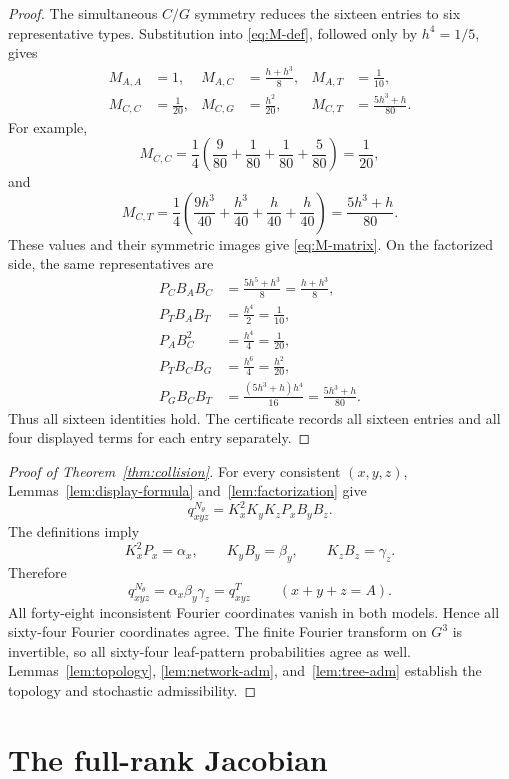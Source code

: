 \documentclass[11pt]{article}
\theoremstyle{remark}
\begin{document}
\begin{proof}
The simultaneous $C/G$ symmetry reduces the sixteen entries to six representative types.  Substitution into \eqref{eq:M-def}, followed only by $h^4=1/5$, gives
\begin{align*}
 M_{A,A}&=1,&
 M_{A,C}&=\frac{h+h^3}{8},&
 M_{A,T}&=\frac1{10},\\
 M_{C,C}&=\frac1{20},&
 M_{C,G}&=\frac{h^2}{20},&
 M_{C,T}&=\frac{5h^3+h}{80}.
\end{align*}
For example,
\[
 M_{C,C}=\frac14\left(\frac9{80}+\frac1{80}+\frac1{80}+\frac5{80}\right)=\frac1{20},
\]
and
\[
 M_{C,T}=\frac14\left(\frac{9h^3}{40}+\frac{h^3}{40}
 +\frac{h}{40}+\frac{h}{40}\right)=\frac{5h^3+h}{80}.
\]
These values and their symmetric images give \eqref{eq:M-matrix}.  On the factorized side, the same representatives are
\begin{align*}
 P_C B_A B_C&=\frac{5h^5+h^3}{8}=\frac{h+h^3}{8},\\
 P_T B_A B_T&=\frac{h^4}{2}=\frac1{10},\\
 P_A B_C^2&=\frac{h^4}{4}=\frac1{20},\\
 P_T B_C B_G&=\frac{h^6}{4}=\frac{h^2}{20},\\
 P_G B_C B_T&=\frac{(5h^3+h)h^4}{16}=\frac{5h^3+h}{80}.
\end{align*}
Thus all sixteen identities hold.  The certificate records all sixteen entries and all four displayed terms for each entry separately.
\end{proof}

\begin{proof}[Proof of Theorem~\ref{thm:collision}]
For every consistent $(x,y,z)$, Lemmas~\ref{lem:display-formula} and~\ref{lem:factorization} give
\[
 q^{N_\theta}_{xyz}
 =K_x^2K_yK_zP_xB_yB_z.
\]
The definitions imply
\[
 K_x^2P_x=\alpha_x,
 \qquad
 K_yB_y=\beta_y,
 \qquad
 K_zB_z=\gamma_z.
\]
Therefore
\begin{equation}\label{eq:full-equality}
 q^{N_\theta}_{xyz}=\alpha_x\beta_y\gamma_z=q^T_{xyz}
 \qquad(x+y+z=A).
\end{equation}
All forty-eight inconsistent Fourier coordinates vanish in both models.  Hence all sixty-four Fourier coordinates agree.  The finite Fourier transform on $G^3$ is invertible, so all sixty-four leaf-pattern probabilities agree as well.  Lemmas~\ref{lem:topology}, \ref{lem:network-adm}, and~\ref{lem:tree-adm} establish the topology and stochastic admissibility.
\end{proof}

\section{The full-rank Jacobian}\label{sec:rank}
\end{document}
